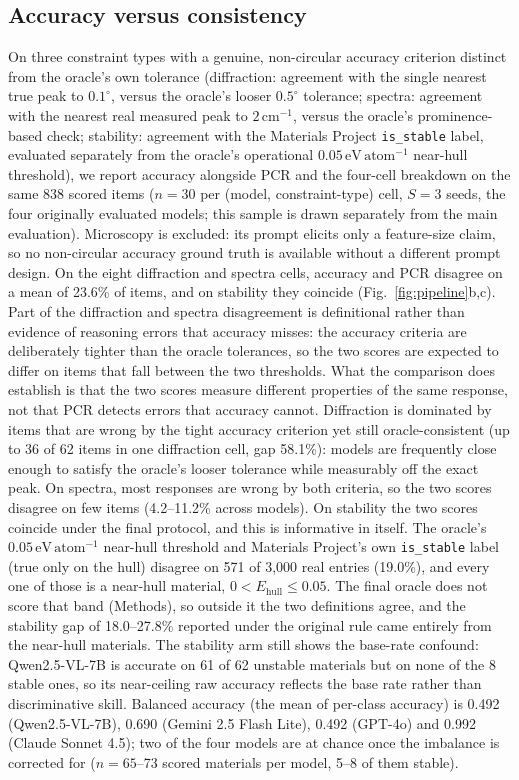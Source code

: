 \documentclass[pdflatex,sn-nature]{sn-jnl}
\newcommand{\rev}[1]{#1}
\newcommand{\rev}[1]{{\color{blue}#1}}
\begin{document}
\subsection*{Accuracy versus consistency}
On three constraint types with a genuine, non-circular accuracy criterion distinct
from the oracle's own tolerance (diffraction: agreement with the single nearest true
peak to $0.1^{\circ}$, versus the oracle's looser $0.5^{\circ}$ tolerance; spectra:
agreement with the nearest real measured peak to $2\,\mathrm{cm}^{-1}$, versus the
oracle's prominence-based check; stability: agreement with the Materials
Project \texttt{is\_stable} label, evaluated separately from the oracle's
operational $0.05\,\mathrm{eV\,atom^{-1}}$ near-hull threshold), we report
accuracy alongside PCR and the four-cell breakdown on the same
\rev{838 scored items} ($n=30$ per (model, constraint-type) cell, $S=3$ seeds\rev{, the four originally evaluated
models; this sample is drawn separately from the main evaluation}). Microscopy is excluded: its
prompt elicits only a feature-size claim, so no non-circular accuracy ground truth is
available without a different prompt design. \rev{On the eight diffraction and spectra cells,
accuracy and PCR disagree on a mean of 23.6\% of items, and on stability they coincide
(Fig.~\ref{fig:pipeline}b,c). Part of the diffraction and spectra disagreement is definitional rather
than evidence of reasoning errors that accuracy misses: the accuracy criteria are deliberately tighter
than the oracle tolerances, so the two scores are expected to differ on items that fall between the two
thresholds. What the comparison does establish is that
the two scores measure different properties of the same response, not that PCR detects errors that
accuracy cannot.} Diffraction is dominated by items
that are wrong by the tight accuracy criterion yet still oracle-consistent (up to 36
of 62 items in one diffraction cell, gap 58.1\%): models are frequently close enough to satisfy the
oracle's looser tolerance while measurably off the exact peak. \rev{On spectra, most responses
are wrong by both criteria, so the two scores disagree on few items} (4.2--11.2\% across models). \rev{On stability the two scores coincide under the final protocol,
and this is informative in itself. The oracle's $0.05\,\mathrm{eV\,atom^{-1}}$ near-hull threshold and
Materials Project's own \texttt{is\_stable} label (true only on the hull) disagree on 571 of 3,000 real
entries (19.0\%), and every one of those is a near-hull material, $0<E_{\mathrm{hull}}\le0.05$. The final
oracle does not score that band (Methods), so outside it the two definitions agree, and the stability gap
of 18.0--27.8\% reported under the original rule came entirely from the near-hull materials. The stability
arm still shows the base-rate confound: Qwen2.5-VL-7B is accurate on 61 of 62 unstable materials but on
none of the 8 stable ones, so its near-ceiling raw accuracy reflects the base rate rather than
discriminative skill. Balanced accuracy (the mean of per-class accuracy) is 0.492 (Qwen2.5-VL-7B), 0.690
(Gemini 2.5 Flash Lite), 0.492 (GPT-4o) and 0.992 (Claude Sonnet 4.5); two of the four models are at
chance once the imbalance is corrected for ($n=65$--73 scored materials per model, 5--8 of them stable).}
\end{document}
